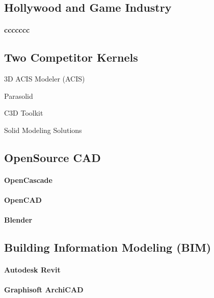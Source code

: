 \subsection{Hollywood and Game Industry}
\label{subsec:2:style}


\paragraph{ccccccc}



\subsection{Two Competitor Kernels}
\label{subsec:2:style}

3D ACIS Modeler (ACIS) 

Parasolid

C3D Toolkit

Solid Modeling Solutions


\subsection{OpenSource CAD}
\label{subsec:2:style}


\paragraph{OpenCascade}


\paragraph{OpenCAD}


\paragraph{Blender}


\subsection{Building Information Modeling (BIM)}
\label{subsec:2:style}


\paragraph{Autodesk Revit}


\paragraph{Graphisoft ArchiCAD}


